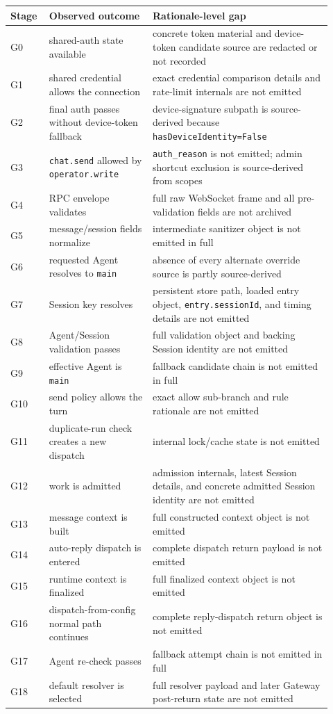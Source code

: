 \begin{longtable}{
    @{}
    >{\raggedright\arraybackslash}p{0.10\linewidth}
    >{\raggedright\arraybackslash}p{0.30\linewidth}
    >{\raggedright\arraybackslash}p{0.52\linewidth}
    @{}
}
\textbf{Stage} & \textbf{Observed outcome} & \textbf{Rationale-level gap} \\
\hline
G0 & shared-auth state available & concrete token material and device-token candidate source are redacted or not recorded \\
G1 & shared credential allows the connection & exact credential comparison details and rate-limit internals are not emitted \\
G2 & final auth passes without device-token fallback & device-signature subpath is source-derived because \texttt{hasDeviceIdentity=False} \\
G3 & \texttt{chat.send} allowed by \texttt{operator.write} & \texttt{auth\_reason} is not emitted; admin shortcut exclusion is source-derived from scopes \\
G4 & RPC envelope validates & full raw WebSocket frame and all pre-validation fields are not archived \\
G5 & message/session fields normalize & intermediate sanitizer object is not emitted in full \\
G6 & requested Agent resolves to \texttt{main} & absence of every alternate override source is partly source-derived \\
G7 & Session key resolves & persistent store path, loaded entry object, \texttt{entry.sessionId}, and timing details are not emitted \\
G8 & Agent/Session validation passes & full validation object and backing Session identity are not emitted \\
G9 & effective Agent is \texttt{main} & fallback candidate chain is not emitted in full \\
G10 & send policy allows the turn & exact allow sub-branch and rule rationale are not emitted \\
G11 & duplicate-run check creates a new dispatch & internal lock/cache state is not emitted \\
G12 & work is admitted & admission internals, latest Session details, and concrete admitted Session identity are not emitted \\
G13 & message context is built & full constructed context object is not emitted \\
G14 & auto-reply dispatch is entered & complete dispatch return payload is not emitted \\
G15 & runtime context is finalized & full finalized context object is not emitted \\
G16 & dispatch-from-config normal path continues & complete reply-dispatch return object is not emitted \\
G17 & Agent re-check passes & fallback attempt chain is not emitted in full \\
G18 & default resolver is selected & full resolver payload and later Gateway post-return state are not emitted \\
\hline
\end{longtable}

